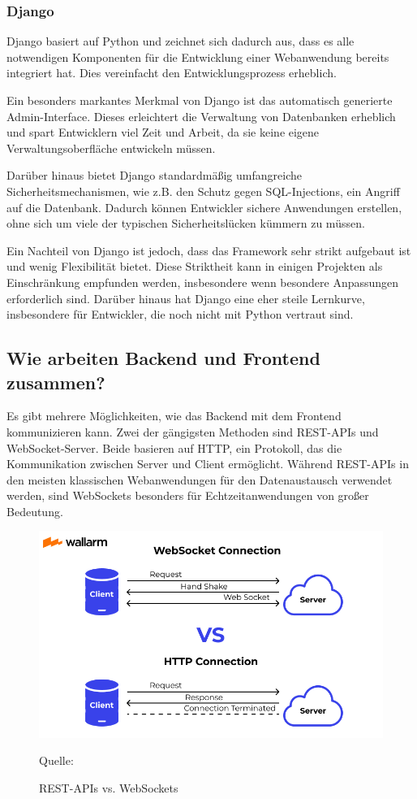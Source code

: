 \documentclass[biblatex]{lni}
\begin{document}
\subsubsection{Django}

Django basiert auf Python und zeichnet sich dadurch aus,
dass es alle notwendigen Komponenten für die Entwicklung einer Webanwendung bereits integriert hat.
Dies vereinfacht den Entwicklungsprozess erheblich.

Ein besonders markantes Merkmal von Django ist das automatisch generierte Admin-Interface.
Dieses erleichtert die Verwaltung von Datenbanken erheblich und spart Entwicklern viel Zeit und Arbeit,
da sie keine eigene Verwaltungsoberfläche entwickeln müssen.

Darüber hinaus bietet Django standardmäßig umfangreiche Sicherheitsmechanismen,
wie z.B. den Schutz gegen SQL-Injections, ein Angriff auf die Datenbank.
Dadurch können Entwickler sichere Anwendungen erstellen,
ohne sich um viele der typischen Sicherheitslücken kümmern zu müssen.

Ein Nachteil von Django ist jedoch,
dass das Framework sehr strikt aufgebaut ist und wenig Flexibilität bietet.
Diese Striktheit kann in einigen Projekten als Einschränkung empfunden werden,
insbesondere wenn besondere Anpassungen erforderlich sind.
Darüber hinaus hat Django eine eher steile Lernkurve, insbesondere für Entwickler, die noch nicht mit Python vertraut sind.

\subsection{Wie arbeiten Backend und Frontend zusammen?}

Es gibt mehrere Möglichkeiten, wie das Backend mit dem Frontend kommunizieren kann.
Zwei der gängigsten Methoden sind REST-APIs und WebSocket-Server.
Beide basieren auf HTTP, ein Protokoll, das die Kommunikation zwischen Server und Client ermöglicht.
Während REST-APIs in den meisten klassischen Webanwendungen für den Datenaustausch verwendet werden,
sind WebSockets besonders für Echtzeitanwendungen von großer Bedeutung.

\begin{figure}
  \centering
  \includegraphics[width=.8\textwidth]{communication}
  \caption{REST-APIs vs. WebSockets}
  \label{fig:communication}
  \vspace{-0.3cm}
  \begin{center}
    \footnotesize Quelle: \cite{WebCon}
  \end{center}
\end{figure}
\end{document}
